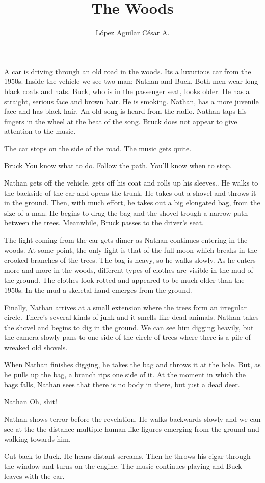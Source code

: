 \documentclass{screenplay}
\title{The Woods}
\author{López Aguilar César A.}
\begin{document}
\coverpage
\fadein

A car is driving through an old road in the woods. Its a luxurious car from the 1950s. Inside the vehicle we see two man: Nathan and Buck. Both men wear long black coats and hats. Buck, who is in the passenger seat, looks older. He has a straight, serious face and brown hair. He is smoking. Nathan, has a more juvenile face and has black hair. An old song is heard from the radio. Nathan taps his fingers in the wheel at the beat of the song. Bruck does not appear to give attention to the music.

The car stops on the side of the road. The music gets quite.
\begin{dialogue}{Bruck}
You know what to do. Follow the path. You'll know when to stop.
\end{dialogue}

Nathan gets off the vehicle, gets off his coat and rolls up his sleeves.. He walks to the backside of the car and opens the trunk. He takes out a shovel and throws it in the ground. Then, with much effort, he takes out a big elongated bag, from the size of a man. He begins to drag the bag and the shovel trough a narrow path between the trees. Meanwhile, Bruck passes to the driver's seat. 

The light coming from the car gets dimer as Nathan continues entering in the woods. At some point, the only light is that of the full moon which breaks in the crooked branches of the trees. The bag is heavy, so he walks slowly. As he enters more and more in the woods, different types of clothes are visible in the mud of the ground. The clothes look rotted and appeared to be much older than the 1950s. In the mud a skeletal hand emerges from the ground.

Finally, Nathan arrives at a small extension where the trees form an irregular circle. There's several kinds of junk and it smells like dead animals. Nathan takes the shovel and begins to dig in the ground. We can see him digging heavily, but the camera slowly pans to one side of the circle of trees where there is a pile of wreaked old shovels.

When Nathan finishes digging, he takes the bag and throws it at the hole. But, as he pulls up the bag, a branch rips one side of it. At the moment in which the bags falls, Nathan sees that there is no body in there, but just a dead deer.

\begin{dialogue}{Nathan}
    Oh, shit!
\end{dialogue}

Nathan shows terror before the revelation. He walks backwards slowly and we can see at the the distance multiple human-like  figures emerging from the ground and walking towards him.

Cut back to Buck. He hears distant screams. Then he throws his cigar through the window and turns on the engine. The music continues playing and Buck leaves with the car.


\fadeout
\end{document}
